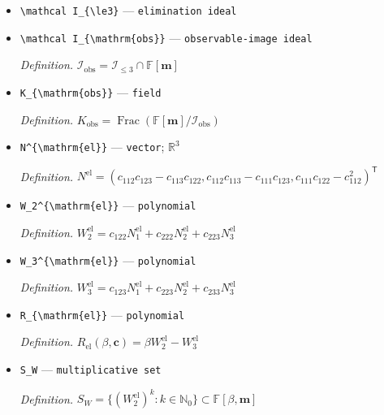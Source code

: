 \documentclass{article}
\begin{document}
\begin{itemize}
  \item \texttt{\textbackslash{}\allowbreak{}mathcal I\_\allowbreak{}\{\textbackslash{}\allowbreak{}le3\}\allowbreak{}} --- \texttt{elimination ideal}
  \item \texttt{\textbackslash{}\allowbreak{}mathcal I\_\allowbreak{}\{\textbackslash{}\allowbreak{}mathrm\{obs\}\allowbreak{}\}\allowbreak{}} --- \texttt{observable-\allowbreak{}image ideal}
  \par\smallskip\noindent\emph{Definition.} \(\mathcal I_{\mathrm{obs}}=\mathcal I_{\le3}\cap\mathbb F[\mathbf m]\)
  \item \texttt{K\_\allowbreak{}\{\textbackslash{}\allowbreak{}mathrm\{obs\}\allowbreak{}\}\allowbreak{}} --- \texttt{field}
  \par\smallskip\noindent\emph{Definition.} \(K_{\mathrm{obs}}=\operatorname{Frac}(\mathbb F[\mathbf m]/\mathcal I_{\mathrm{obs}})\)
  \item \texttt{N\textasciicircum{}\{\textbackslash{}\allowbreak{}mathrm\{el\}\allowbreak{}\}\allowbreak{}} --- \texttt{vector}; \(\mathbb R^3\)
  \par\smallskip\noindent\emph{Definition.} \(N^{\mathrm{el}}=(c_{112}c_{123}-c_{113}c_{122},c_{112}c_{113}-c_{111}c_{123},c_{111}c_{122}-c_{112}^2)^{\mathsf T}\)
  \item \texttt{W\_\allowbreak{}2\textasciicircum{}\{\textbackslash{}\allowbreak{}mathrm\{el\}\allowbreak{}\}\allowbreak{}} --- \texttt{polynomial}
  \par\smallskip\noindent\emph{Definition.} \(W_2^{\mathrm{el}}=c_{122}N^{\mathrm{el}}_1+c_{222}N^{\mathrm{el}}_2+c_{223}N^{\mathrm{el}}_3\)
  \item \texttt{W\_\allowbreak{}3\textasciicircum{}\{\textbackslash{}\allowbreak{}mathrm\{el\}\allowbreak{}\}\allowbreak{}} --- \texttt{polynomial}
  \par\smallskip\noindent\emph{Definition.} \(W_3^{\mathrm{el}}=c_{123}N^{\mathrm{el}}_1+c_{223}N^{\mathrm{el}}_2+c_{233}N^{\mathrm{el}}_3\)
  \item \texttt{R\_\allowbreak{}\{\textbackslash{}\allowbreak{}mathrm\{el\}\allowbreak{}\}\allowbreak{}} --- \texttt{polynomial}
  \par\smallskip\noindent\emph{Definition.} \(R_{\mathrm{el}}(\beta,\mathbf c)=\beta W_2^{\mathrm{el}}-W_3^{\mathrm{el}}\)
  \item \texttt{S\_\allowbreak{}W} --- \texttt{multiplicative set}
  \par\smallskip\noindent\emph{Definition.} \(S_W=\{(W_2^{\mathrm{el}})^k:k\in\mathbb N_0\}\subset\mathbb F[\beta,\mathbf m]\)

\end{itemize}
\end{document}
